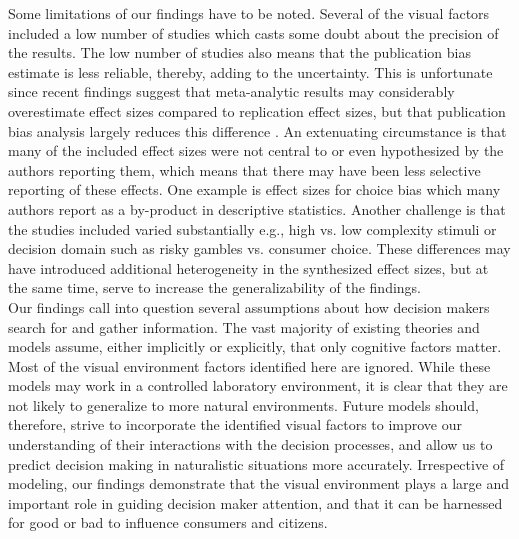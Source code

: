 \documentclass[english,natbib,man,floatsintext]{apa6}
\begin{document}
Some limitations of our findings have to be noted. Several of the visual factors included a low number of studies which casts some doubt about the precision of the results. The low number of studies also means that the publication bias estimate is less reliable, thereby, adding to the uncertainty. This is unfortunate since recent findings suggest that meta-analytic results may considerably overestimate effect sizes compared to replication effect sizes, but that publication bias analysis largely reduces this difference \citep{kvarven2020}. An extenuating circumstance is that many of the included effect sizes were not central to or even hypothesized by the authors reporting them, which means that there may have been less selective reporting of these effects. One example is effect sizes for choice bias which many authors report as a by-product in descriptive statistics. Another challenge is that the studies included varied substantially e.g., high vs. low complexity stimuli or decision domain such as risky gambles vs. consumer choice. These differences may have introduced additional heterogeneity in the synthesized effect sizes, but at the same time, serve to increase the generalizability of the findings.\\ 

Our findings call into question several assumptions about how decision makers search for and gather information. The vast majority of existing theories and models assume, either implicitly or explicitly, that only cognitive factors matter. Most of the visual environment factors identified here are ignored. While these models may work in a controlled laboratory environment, it is clear that they are not likely to generalize to more natural environments. Future models should, therefore, strive to incorporate the identified visual factors to improve our understanding of their interactions with the decision processes, and allow us to predict decision making in naturalistic situations more accurately. Irrespective of modeling, our findings demonstrate that the visual environment plays a large and important role in guiding decision maker attention, and that it can be harnessed for good or bad to influence consumers and citizens.  


\end{document}
